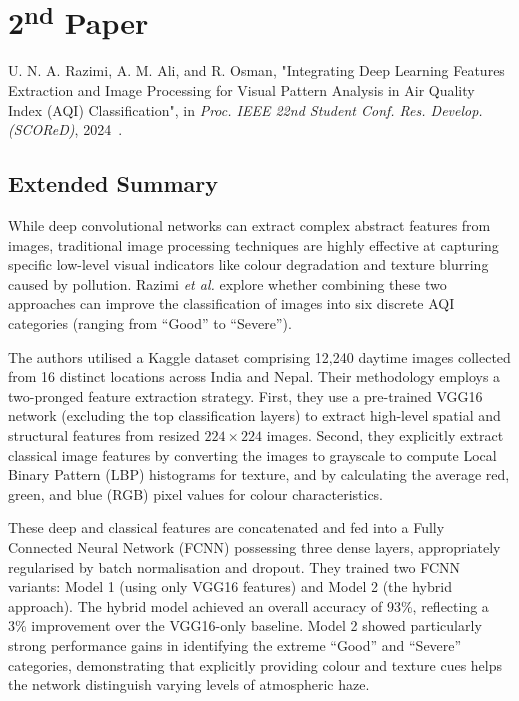 \documentclass[conference]{IEEEtran}
\begin{document}
\section{2\textsuperscript{nd} Paper}
U. N. A. Razimi, A. M. Ali, and R. Osman, "Integrating Deep Learning Features Extraction and Image Processing for Visual Pattern Analysis in Air Quality Index (AQI) Classification", in \textit{Proc. IEEE 22nd Student Conf. Res. Develop. (SCOReD)}, 2024~\cite{razimi2024}.

\subsection{Extended Summary}
While deep convolutional networks can extract complex abstract features from images, traditional image processing techniques are highly effective at capturing specific low-level visual indicators like colour degradation and texture blurring caused by pollution. Razimi \textit{et al.} explore whether combining these two approaches can improve the classification of images into six discrete AQI categories (ranging from ``Good'' to ``Severe''). 

The authors utilised a Kaggle dataset comprising 12,240 daytime images collected from 16 distinct locations across India and Nepal. Their methodology employs a two-pronged feature extraction strategy. First, they use a pre-trained VGG16 network (excluding the top classification layers) to extract high-level spatial and structural features from resized $224 \times 224$ images. Second, they explicitly extract classical image features by converting the images to grayscale to compute Local Binary Pattern (LBP) histograms for texture, and by calculating the average red, green, and blue (RGB) pixel values for colour characteristics. 

These deep and classical features are concatenated and fed into a Fully Connected Neural Network (FCNN) possessing three dense layers, appropriately regularised by batch normalisation and dropout. They trained two FCNN variants: Model 1 (using only VGG16 features) and Model 2 (the hybrid approach). The hybrid model achieved an overall accuracy of 93\%, reflecting a 3\% improvement over the VGG16-only baseline. Model 2 showed particularly strong performance gains in identifying the extreme ``Good'' and ``Severe'' categories, demonstrating that explicitly providing colour and texture cues helps the network distinguish varying levels of atmospheric haze.
\end{document}
